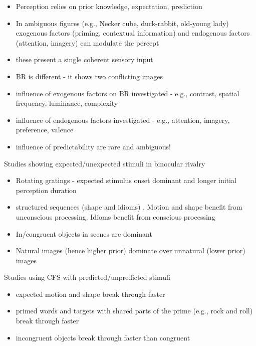 \documentclass[]{article}
\begin{document}
\begin{itemize}
	\item Perception relies on prior knowledge, expectation, prediction
	\item In ambiguous figures (e.g., Necker cube, duck-rabbit, old-young lady) exogenous factors (priming, contextual information) and endogenous factors (attention, imagery) can modulate the percept
	\item these present a single coherent sensory input
	\item BR is different - it shows two conflicting images 
	\item influence of exogenous factors on BR investigated - e.g., contrast, spatial frequency, luminance, complexity
	\item influence of endogenous factors investigated - e.g., attention, imagery, preference, valence
	\item influence of predictability are rare and ambiguous!
\end{itemize}
Studies showing expected/unexpected stimuli in binocular rivalry 
\begin{itemize}
	\item Rotating gratings - expected stimulus onset dominant and longer initial perception duration \cite{denisonPredictiveContextInfluences2011,attarhaOnsetRivalryFactors2015,huVisualTemporalIntegration2021}
	\item structured sequences (shape and idioms) \cite{huVisualTemporalIntegration2021}.
	Motion and shape benefit from unconscious processing. Idioms benefit from conscious processing
	\item In/congruent objects in scenes are dominant \cite{mudrikSceneCongruencyBiases2011,zachariaDoesValenceInfluence2020}
	\item Natural images (hence higher prior) dominate over unnatural (lower prior) images \cite{bakerNaturalImagesDominate2009}
\end{itemize}
Studies using CFS with predicted/unpredicted stimuli
\begin{itemize}
	\item expected motion and shape break through faster \cite{huVisualTemporalIntegration2021}
	\item primed words and targets with shared parts of the prime (e.g., rock and roll) break through faster \cite{costelloSemanticSubwordPriming2009}
	\item incongruent objects break through faster than congruent \cite{mudrikIntegrationAwarenessExpanding2011}
\end{itemize}

\printbibliography
\end{document}
